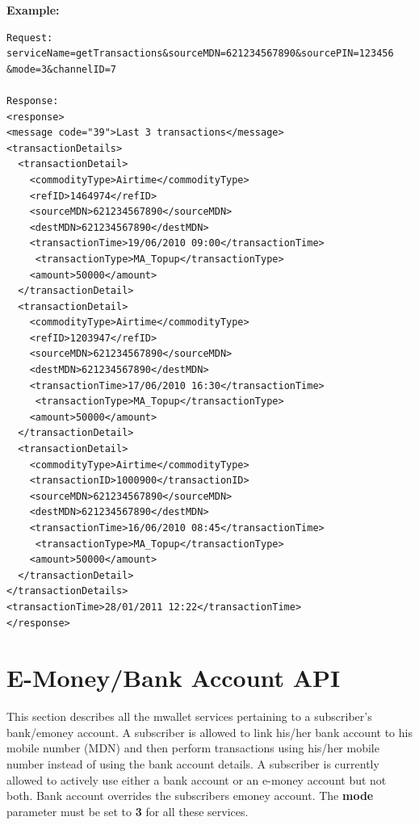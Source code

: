 \documentclass[11pt,titlepage]{article}
\begin{document}
\textbf{Example:}
\begin{verbatim}
Request:
serviceName=getTransactions&sourceMDN=621234567890&sourcePIN=123456
&mode=3&channelID=7

Response:
<response>
<message code="39">Last 3 transactions</message>
<transactionDetails>
  <transactionDetail>
    <commodityType>Airtime</commodityType>
    <refID>1464974</refID>
    <sourceMDN>621234567890</sourceMDN>
    <destMDN>621234567890</destMDN>
    <transactionTime>19/06/2010 09:00</transactionTime>
	 <transactionType>MA_Topup</transactionType>
    <amount>50000</amount>
  </transactionDetail>
  <transactionDetail>
    <commodityType>Airtime</commodityType>
    <refID>1203947</refID>
    <sourceMDN>621234567890</sourceMDN>
    <destMDN>621234567890</destMDN>
    <transactionTime>17/06/2010 16:30</transactionTime>
	 <transactionType>MA_Topup</transactionType>
    <amount>50000</amount>
  </transactionDetail>
  <transactionDetail>
    <commodityType>Airtime</commodityType>
    <transactionID>1000900</transactionID>
    <sourceMDN>621234567890</sourceMDN>
    <destMDN>621234567890</destMDN>
    <transactionTime>16/06/2010 08:45</transactionTime>
	 <transactionType>MA_Topup</transactionType>
    <amount>50000</amount>
  </transactionDetail>
</transactionDetails>
<transactionTime>28/01/2011 12:22</transactionTime>
</response>

\end{verbatim}

\section{E-Money/Bank Account API}
This section describes all the mwallet services pertaining to a subscriber's bank/emoney account. A subscriber is allowed to link his/her bank account to his mobile number (MDN) and then perform transactions using his/her mobile number instead of using the bank account details. A subscriber is currently allowed to actively use either a bank account or an e-money account but not both. Bank account overrides the subscribers emoney account. The \textbf{mode} parameter must be set to {\textbf 3} for all these services. 
\end{document}
